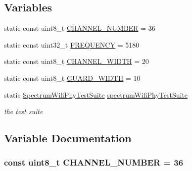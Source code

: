 \subsection*{Variables}
\begin{DoxyCompactItemize}
\item 
static const uint8\+\_\+t \hyperlink{spectrum-wifi-phy-test_8cc_a2040715c66f41d2aeb803276c77619c4}{C\+H\+A\+N\+N\+E\+L\+\_\+\+N\+U\+M\+B\+ER} = 36
\item 
static const uint32\+\_\+t \hyperlink{spectrum-wifi-phy-test_8cc_ad1a292c96f313d36071b5faf0377f606}{F\+R\+E\+Q\+U\+E\+N\+CY} = 5180
\item 
static const uint8\+\_\+t \hyperlink{spectrum-wifi-phy-test_8cc_a56c66ac67787ad7c5eebe2556141456d}{C\+H\+A\+N\+N\+E\+L\+\_\+\+W\+I\+D\+TH} = 20
\item 
static const uint8\+\_\+t \hyperlink{spectrum-wifi-phy-test_8cc_a4f70654e6fd5811f04e8797eedd3bf44}{G\+U\+A\+R\+D\+\_\+\+W\+I\+D\+TH} = 10
\item 
static \hyperlink{classSpectrumWifiPhyTestSuite}{Spectrum\+Wifi\+Phy\+Test\+Suite} \hyperlink{spectrum-wifi-phy-test_8cc_a577c0ed6dce84b597b52864eaea7d32a}{spectrum\+Wifi\+Phy\+Test\+Suite}
\begin{DoxyCompactList}\small\item\em the test suite \end{DoxyCompactList}\end{DoxyCompactItemize}


\subsection{Variable Documentation}
\subsubsection[{\texorpdfstring{C\+H\+A\+N\+N\+E\+L\+\_\+\+N\+U\+M\+B\+ER}{CHANNEL_NUMBER}}]{\setlength{\rightskip}{0pt plus 5cm}const uint8\+\_\+t C\+H\+A\+N\+N\+E\+L\+\_\+\+N\+U\+M\+B\+ER = 36\hspace{0.3cm}{\ttfamily [static]}}\hypertarget{spectrum-wifi-phy-test_8cc_a2040715c66f41d2aeb803276c77619c4}{}\label{spectrum-wifi-phy-test_8cc_a2040715c66f41d2aeb803276c77619c4}
